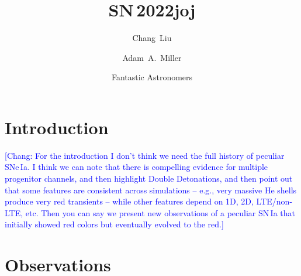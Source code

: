 \documentclass[twocolumn]{aastex631}
\newcommand{\chang}[1]{\textcolor{blue}{[Chang: #1]}}
\begin{document}
\begin{CJK*}{UTF8}{gbsn}

\title{SN\,2022joj}

\author[0000-0002-7866-4531]{Chang~Liu}

\author[0000-0001-9515-478X]{Adam~A.~Miller}

\author{Fantastic Astronomers}
\begin{abstract} 
%

%
\end{abstract}


\section{Introduction} \label{sec:intro}

\chang{For the introduction I don't think we need the full history of peculiar SNe\,Ia. I think we can note that there is compelling evidence for multiple progenitor channels, and then highlight Double Detonations, and then point out that some features are consistent across simulations -- e.g., very massive He shells produce very red transients -- while other features depend on 1D, 2D, LTE/non-LTE, etc. Then you can say we present new observations of a peculiar SN\,Ia that initially showed red colors but eventually evolved to the red.}

\section{Observations} \label{sec:obs}

\end{CJK*}
\end{document}
